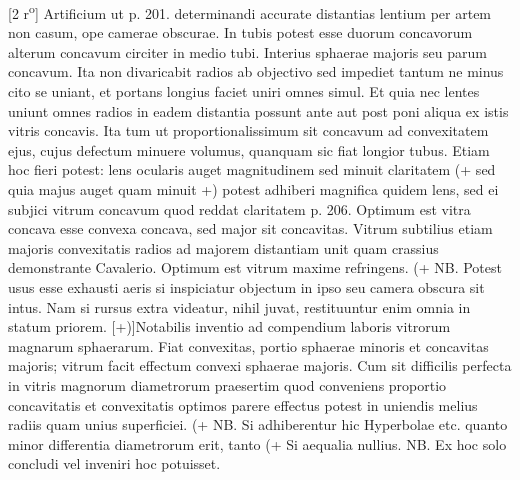         \vspace*{8mm}
        \pstart 
        \normalsize
      [2 r\textsuperscript{o}] Artificium ut p. 201. determinandi accurate distantias lentium\protect{} per artem non casum, ope camerae obscurae\protect{}. \pend \pstart In tubis   potest esse duorum concavorum alterum concavum circiter in medio tubi. Interius sphaerae majoris seu parum concavum. Ita non divaricabit radios ab objectivo\protect{} sed impediet tantum ne minus cito se uniant, et portans longius faciet uniri omnes simul. Et quia nec lentes\protect{} uniunt omnes radios in eadem distantia possunt ante aut post poni aliqua ex istis vitris concavis. Ita tum ut proportionalissimum sit concavum ad convexitatem ejus, cujus defectum minuere volumus, quanquam sic fiat longior tubus. \pend \pstart Etiam hoc fieri potest: lens\protect{} ocularis auget magnitudinem sed minuit claritatem (+ sed quia majus auget quam minuit +)  potest adhiberi magnifica quidem lens\protect{}, sed ei subjici vitrum concavum quod reddat claritatem p. 206. \pend \pstart Optimum est vitra concava esse convexa concava, sed major sit concavitas. \pend \pstart Vitrum subtilius etiam majoris convexitatis radios ad majorem distantiam unit quam crassius demonstrante Cavalerio\protect{}.  \pend \pstart Optimum est vitrum maxime refringens. \pend \pstart (+ NB. Potest usus esse exhausti aeris si inspiciatur objectum in ipso seu camera obscura\protect{} sit intus. Nam si rursus extra videatur, nihil juvat, restituuntur enim omnia in statum priorem. [+)]\pend \pstart Notabilis inventio ad compendium laboris vitrorum magnarum sphaerarum. Fiat convexitas, portio sphaerae minoris et concavitas majoris; vitrum facit effectum convexi sphaerae majoris. Cum sit difficilis perfecta  in vitris magnorum diametrorum praesertim quod conveniens proportio concavitatis et convexitatis optimos parere effectus potest in uniendis melius radiis quam unius superficiei. (+ NB. Si adhiberentur hic Hyperbolae etc. quanto minor differentia diametrorum erit, tanto (+ Si aequalia nullius. NB. Ex hoc solo concludi vel inveniri hoc potuisset. 